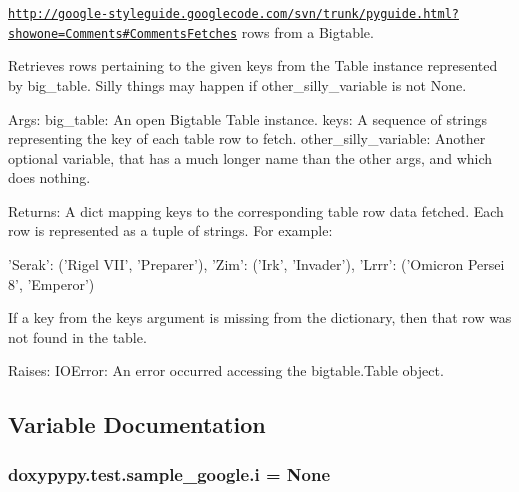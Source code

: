 \href{http://google-styleguide.googlecode.com/svn/trunk/pyguide.html?showone=Comments#CommentsFetches}{\tt http\-://google-\/styleguide.\-googlecode.\-com/svn/trunk/pyguide.\-html?showone=\-Comments\#\-Comments\-Fetches} rows from a Bigtable. \begin{DoxyVerb}Retrieves rows pertaining to the given keys from the Table instance
represented by big_table.  Silly things may happen if
other_silly_variable is not None.

Args:
    big_table: An open Bigtable Table instance.
    keys: A sequence of strings representing the key of each table row
        to fetch.
    other_silly_variable: Another optional variable, that has a much
        longer name than the other args, and which does nothing.

Returns:
    A dict mapping keys to the corresponding table row data
    fetched. Each row is represented as a tuple of strings. For
    example:

    {'Serak': ('Rigel VII', 'Preparer'),
     'Zim': ('Irk', 'Invader'),
     'Lrrr': ('Omicron Persei 8', 'Emperor')}

    If a key from the keys argument is missing from the dictionary,
    then that row was not found in the table.

Raises:
    IOError: An error occurred accessing the bigtable.Table object.\end{DoxyVerb}
 

\subsection{Variable Documentation}
\hypertarget{namespacedoxypypy_1_1test_1_1sample__google_ae3f68c33f3bd828c0ae014c276ee07b1}{
\subsubsection[{i}]{\setlength{\rightskip}{0pt plus 5cm}doxypypy.\-test.\-sample\-\_\-google.\-i = None}}\label{namespacedoxypypy_1_1test_1_1sample__google_ae3f68c33f3bd828c0ae014c276ee07b1}
